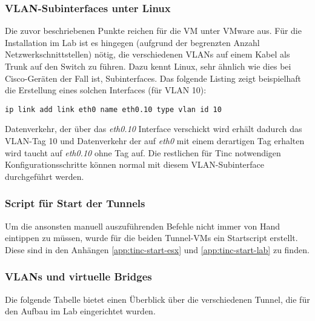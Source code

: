 \subsubsection{VLAN-Subinterfaces unter Linux}
Die zuvor beschriebenen Punkte reichen für die VM unter VMware aus. Für die Installation im Lab ist es hingegen (aufgrund der begrenzten Anzahl Netzwerkschnittstellen) nötig, die verschiedenen VLANs auf einem Kabel als Trunk auf den Switch zu führen. Dazu kennt Linux, sehr ähnlich wie dies bei Cisco-Geräten der Fall ist, Subinterfaces. Das folgende Listing zeigt beispielhaft die Erstellung eines solchen Interfaces (für VLAN 10):

\begin{lstlisting}
ip link add link eth0 name eth0.10 type vlan id 10
\end{lstlisting}

Datenverkehr, der über das \emph{eth0.10} Interface verschickt wird erhält dadurch das VLAN-Tag 10 und Datenverkehr der auf \emph{eth0} mit einem derartigen Tag erhalten wird taucht auf \emph{eth0.10} ohne Tag auf. Die restlichen für Tinc notwendigen Konfigurationsschritte können normal mit diesem VLAN-Subinterface durchgeführt werden.

\subsubsection{Script für Start der Tunnels}
Um die ansonsten manuell auszuführenden Befehle nicht immer von Hand eintippen zu müssen, wurde für die beiden Tunnel-VMs ein Startscript erstellt. Diese sind in den Anhängen \ref{app:tinc-start-esx} und \ref{app:tinc-start-lab} zu finden.

\subsubsection{VLANs und virtuelle Bridges}
Die folgende Tabelle bietet einen Überblick über die verschiedenen Tunnel, die für den Aufbau im Lab eingerichtet wurden.

